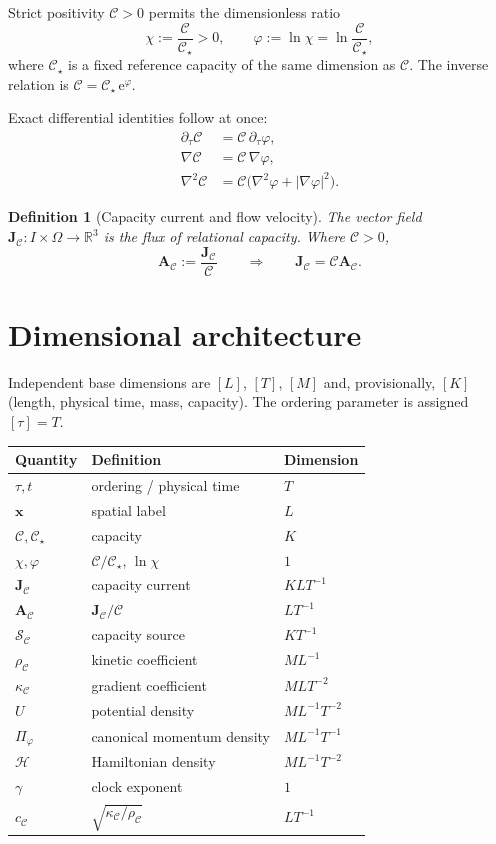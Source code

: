 \documentclass[11pt,a4paper]{article}
\newtheorem{definition}[axiom]{Definition}
\newcommand{\C}{\mathcal{C}}
\newcommand{\Cs}{\mathcal{C}_\star}
\newcommand{\Jc}{\mathbf{J}_{\mathcal{C}}}
\newcommand{\Sc}{\mathcal{S}_{\mathcal{C}}}
\newcommand{\Ac}{\mathbf{A}_{\mathcal{C}}}
\newcommand{\e}{\mathrm{e}}
\newcommand{\Ham}{\mathcal{H}}
\newcommand{\rhoC}{\rho_{\mathcal{C}}}
\newcommand{\kC}{\kappa_{\mathcal{C}}}
\begin{document}
Strict positivity \(\C>0\) permits the dimensionless ratio
\[
\chi:=\frac{\C}{\Cs}>0,\qquad\varphi:=\ln\chi=\ln\frac{\C}{\Cs},
\]
where \(\Cs\) is a fixed reference capacity of the same dimension as \(\C\). The inverse relation is \(\C=\Cs\,\e^\varphi\).

Exact differential identities follow at once:
\begin{align}
\partial_\tau\C&=\C\,\partial_\tau\varphi,\\
\nabla\C&=\C\,\nabla\varphi,\\
\nabla^2\C&=\C\bigl(\nabla^2\varphi+|\nabla\varphi|^2\bigr).
\end{align}

\begin{definition}[Capacity current and flow velocity]
The vector field \(\Jc:I\times\Omega\to\mathbb{R}^3\) is the flux of relational capacity. Where \(\C>0\),
\[
\Ac:=\frac{\Jc}{\C}\qquad\Rightarrow\qquad\Jc=\C\Ac.
\]
\end{definition}

\section{Dimensional architecture}

Independent base dimensions are \([L]\), \([T]\), \([M]\) and, provisionally, \([K]\) (length, physical time, mass, capacity). The ordering parameter is assigned \([\tau]=T\).

\begin{center}
\begin{tabular}{@{}lll@{}}
\toprule
Quantity & Definition & Dimension\\
\midrule
\(\tau,t\) & ordering / physical time & \(T\)\\
\(\mathbf{x}\) & spatial label & \(L\)\\
\(\C,\Cs\) & capacity & \(K\)\\
\(\chi,\varphi\) & \(\C/\Cs\), \(\ln\chi\) & \(1\)\\
\(\Jc\) & capacity current & \(KLT^{-1}\)\\
\(\Ac\) & \(\Jc/\C\) & \(LT^{-1}\)\\
\(\Sc\) & capacity source & \(KT^{-1}\)\\
\(\rhoC\) & kinetic coefficient & \(ML^{-1}\)\\
\(\kC\) & gradient coefficient & \(MLT^{-2}\)\\
\(U\) & potential density & \(ML^{-1}T^{-2}\)\\
\(\Pi_\varphi\) & canonical momentum density & \(ML^{-1}T^{-1}\)\\
\(\Ham\) & Hamiltonian density & \(ML^{-1}T^{-2}\)\\
\(\gamma\) & clock exponent & \(1\)\\
\(c_{\mathcal{C}}\) & \(\sqrt{\kC/\rhoC}\) & \(LT^{-1}\)\\
\bottomrule
\end{tabular}
\end{center}
\end{document}
